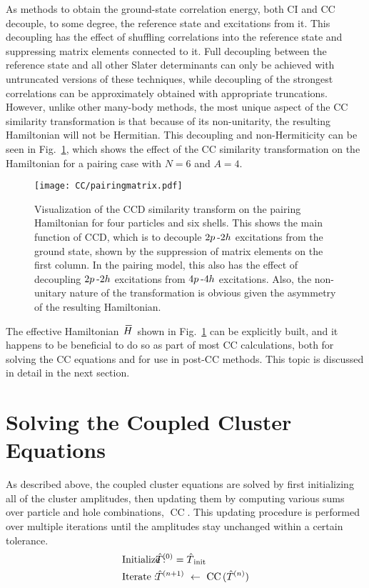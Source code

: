 \documentclass[thesis.tex]{subfiles}
\begin{document}
As methods to obtain the ground-state correlation energy, both CI and CC decouple, to some degree, the reference state and excitations from it.  This decoupling has the effect of shuffling correlations into the reference state and suppressing matrix elements connected to it.  Full decoupling between the reference state and all other Slater determinants can only be achieved with untruncated versions of these techniques, while decoupling of the strongest correlations can be approximately obtained with appropriate truncations.  However, unlike other many-body methods, the most unique aspect of the CC similarity transformation is that because of its non-unitarity, the resulting Hamiltonian will not be Hermitian.  This decoupling and non-Hermiticity can be seen in Fig.\ \ref{fig:pairingmatrix}, which shows the effect of the CC similarity transformation on the Hamiltonian for a pairing case with $N = 6$ and $A = 4$.
\begin{figure}[h]
  \centering
  \texttt{[image: CC/pairingmatrix.pdf]}
  \caption{Visualization of the CCD similarity transform on the pairing Hamiltonian for four particles and six shells.  This shows the main function of CCD, which is to decouple $2p\hspace{2pt}\text{-}2h$ excitations from the ground state, shown by the suppression of matrix elements on the first column. In the pairing model, this also has the effect of decoupling $2p\hspace{2pt}\text{-}2h$ excitations from $4p\hspace{2pt}\text{-}4h$ excitations.  Also, the non-unitary nature of the transformation is obvious given the asymmetry of the resulting Hamiltonian.}
  \label{fig:pairingmatrix}
\end{figure}
The effective Hamiltonian $\EHam$ shown in Fig.\ \ref{fig:pairingmatrix} can be explicitly built, and it happens to be beneficial to do so as part of most CC calculations, both for solving the CC equations and for use in post-CC methods.  This topic is discussed in detail in the next section.




\section{Solving the Coupled Cluster Equations} \label{section:solvingcc}

As described above, the coupled cluster equations are solved by first initializing all of the cluster amplitudes, then updating them by computing various sums over particle and hole combinations, $\text{CC}\mathop{(\Top)}$.  This updating procedure is performed over multiple iterations until the amplitudes stay unchanged within a certain tolerance.
\begin{align} \label{eq:cc_algorithm}
  &\text{Initialize}:&    \hspace{-20pt}&\Top^{\mathop{(0)}} = \Top_{\text{init}} \notag \\
  &\text{Iterate}:&       \hspace{-20pt}&\Top^{\mathop{(n+1)}}\ \leftarrow\ \text{CC}\mathop{(\Top^{\mathop{(n)}})}
\end{align}
\end{document}
